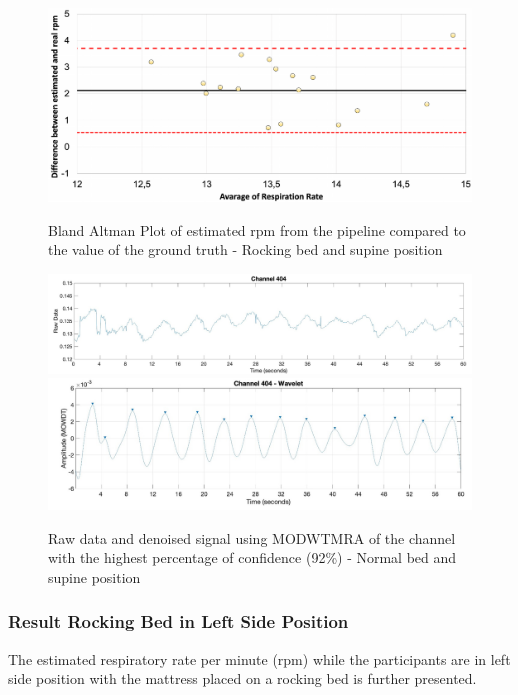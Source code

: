 \begin{figure}[p]
  \centering
  \includegraphics[width=\textwidth]{img/balnd1.pdf}

  \caption{Bland Altman Plot of estimated rpm from the pipeline compared to the value of the ground truth - Rocking bed and supine position}
  \label{fig:baln1}
  \vspace{1.5cm}
  \includegraphics[width=\textwidth]{img/404.jpg}
  \includegraphics[width=\textwidth]{img/404_wave.jpg}
\caption{Raw data and denoised signal using MODWTMRA of the channel with the highest percentage of confidence (92\%) - Normal bed and supine position}
  \label{fig:rec}
\end{figure}

\clearpage
\subsubsection{Result Rocking Bed in Left Side Position}  %

The estimated respiratory rate per minute (rpm) while the participants are in left side position with the mattress placed on a rocking bed is further presented. 

